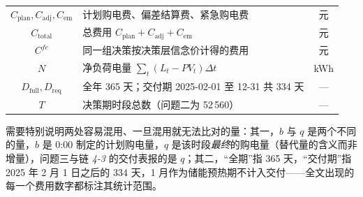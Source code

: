 \begin{center}
\begin{tabular}{clc}
$C_{\text{plan}},C_{\text{adj}},C_{\text{em}}$ & 计划购电费、偏差结算费、紧急购电费 & 元 \\
$C_{\text{total}}$ & 总费用 $C_{\text{plan}}+C_{\text{adj}}+C_{\text{em}}$ & 元 \\
$C^{fc}$ & 同一组决策按决策层信念价计得的费用 & 元 \\
$N$ & 净负荷电量 $\sum_t(L_t-PV_t)\Delta t$ & kWh \\
$D_{\text{full}},D_{\text{req}}$ & 全年 365 天；交付期 2025-02-01 至 12-31 共 334 天 & --- \\
$T$ & 决策期时段总数（问题二为 52\,560） & --- \\
\bottomrule
\end{tabular}
\end{center}

需要特别说明两处容易混用、一旦混用就无法比对的量：其一，$b$ 与 $q$ 是两个不同的量，$b$ 是 0:00 制定的计划购电量，$q$ 是该时段\emph{最终}的购电量（替代量的含义而非增量），问题三与链 \emph{4-3} 的交付表报的是 $q$；其二，“全期”指 365 天，“交付期”指 2025 年 2 月 1 日之后的 334 天，1 月作为储能预热期不计入交付——全文出现的每一个费用数字都标注其统计范围。
